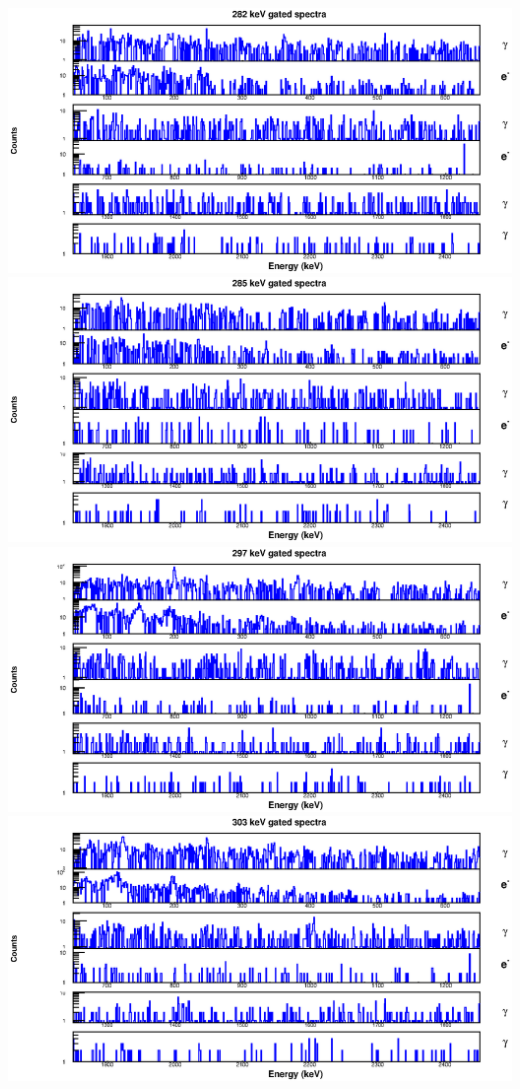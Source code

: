 \begin{landscape}
\includegraphics[scale=1.2]{154Gd_Appendix/282_combined.eps}
\includegraphics[scale=1.2]{154Gd_Appendix/285_combined.eps}
\includegraphics[scale=1.2]{154Gd_Appendix/297_combined.eps}
\includegraphics[scale=1.2]{154Gd_Appendix/303_combined.eps}

\end{landscape}
